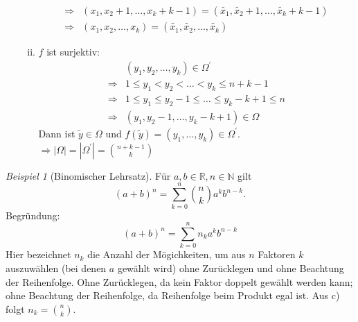 \documentclass[a4paper,12pt,fleqn]{scrartcl}
\newcommand{\N}{\mathbb{N}}
\newcommand{\R}{\mathbb{R}}
\newcommand{\impl}{\Rightarrow}
\theoremstyle{definition}
\theoremstyle{plain}
\theoremstyle{remark}
\newtheorem{beispiel}[definition]{Beispiel}
\begin{document}
\begin{enumerate}[a)]
\begin{enumerate}[(i)]
\begin{align*}
\impl & (x_1, x_2+1, \ldots, x_k+k-1) = (\widetilde{x_1}, \widetilde{x_2}+1, \ldots, \widetilde{x_k}+k-1) \\
\impl & (x_1, x_2, \ldots, x_k) = (\widetilde{x_1}, \widetilde{x_2}, \ldots, \widetilde{x_k})
\end{align*}
\item $f$ ist surjektiv:
\begin{align*}
&(y_1, y_2, \ldots, y_k) \in \Omega^\prime \\
\impl & 1 \leq y_1 < y_2 <\ldots < y_k \leq n+k-1 \\
\impl & 1 \leq y_1 \leq y_2-1 \leq \ldots \leq y_k-k+1 \leq n \\
\impl & (y_1,y_2-1, \ldots , y_k-k+1) \in \Omega
\end{align*}
Dann ist $\widetilde{y} \in \Omega$ und $f(\widetilde{y})=(y_1, \ldots, y_k) \in \Omega^\prime$. \\
$\impl | \Omega | = | \Omega^\prime | = \binom{n+k-1}{k}$
\end{enumerate}
\end{enumerate}
\begin{beispiel}[Binomischer Lehrsatz]
Für $a, b \in \R, n \in \N$ gilt 
\[(a+b)^{n} = \sum_{k=0}^{n} \binom{n}{k} a^{k} b^{n-k}.\]
Begründung:
\[(a+b)^{n} = \sum_{k=0}^{n} n_k a^{k} b^{n-k}\]
Hier bezeichnet $n_k$ die Anzahl der Mögichkeiten, um aus $n$ Faktoren $k$ auszuwählen (bei denen $a$ gewählt wird) ohne Zurücklegen und ohne Beachtung der Reihenfolge. Ohne Zurücklegen, da kein Faktor doppelt gewählt werden kann; ohne Beachtung der Reihenfolge, da Reihenfolge beim Produkt egal ist. Aus c) folgt $n_k = \binom{n}{k}$.
\end{beispiel}
\end{document}
